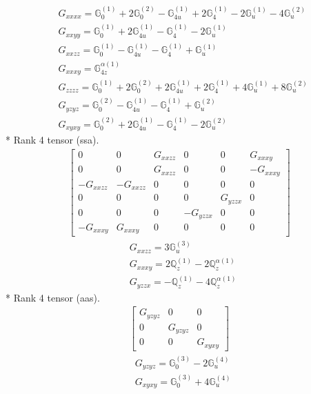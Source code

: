 \documentclass[fleqn,8pt,landscape]{jsarticle}
\begin{document}
\begin{align*}
& G_{xxxx} = \mathbb{G}_{0}^{(1)} + 2 \mathbb{G}_{0}^{(2)} - \mathbb{G}_{4u}^{(1)} + 2 \mathbb{G}_{4}^{(1)} - 2 \mathbb{G}_{u}^{(1)} - 4 \mathbb{G}_{u}^{(2)} \\
& G_{xxyy} = \mathbb{G}_{0}^{(1)} + 2 \mathbb{G}_{4u}^{(1)} - \mathbb{G}_{4}^{(1)} - 2 \mathbb{G}_{u}^{(1)} \\
& G_{xxzz} = \mathbb{G}_{0}^{(1)} - \mathbb{G}_{4u}^{(1)} - \mathbb{G}_{4}^{(1)} + \mathbb{G}_{u}^{(1)} \\
& G_{xxxy} = \mathbb{G}_{4z}^{\alpha(1)} \\
& G_{zzzz} = \mathbb{G}_{0}^{(1)} + 2 \mathbb{G}_{0}^{(2)} + 2 \mathbb{G}_{4u}^{(1)} + 2 \mathbb{G}_{4}^{(1)} + 4 \mathbb{G}_{u}^{(1)} + 8 \mathbb{G}_{u}^{(2)} \\
& G_{yzyz} = \mathbb{G}_{0}^{(2)} - \mathbb{G}_{4u}^{(1)} - \mathbb{G}_{4}^{(1)} + \mathbb{G}_{u}^{(2)} \\
& G_{xyxy} = \mathbb{G}_{0}^{(2)} + 2 \mathbb{G}_{4u}^{(1)} - \mathbb{G}_{4}^{(1)} - 2 \mathbb{G}_{u}^{(2)}
\end{align*}
* Rank 4 tensor (ssa).
\begin{align*}
\begin{bmatrix} 0 & 0 & G_{xxzz} & 0 & 0 & G_{xxxy} \\ 0 & 0 & G_{xxzz} & 0 & 0 & - G_{xxxy} \\ - G_{xxzz} & - G_{xxzz} & 0 & 0 & 0 & 0 \\ 0 & 0 & 0 & 0 & G_{yzzx} & 0 \\ 0 & 0 & 0 & - G_{yzzx} & 0 & 0 \\ - G_{xxxy} & G_{xxxy} & 0 & 0 & 0 & 0 \end{bmatrix}
\end{align*}
\begin{align*}
& G_{xxzz} = 3 \mathbb{G}_{u}^{(3)} \\
& G_{xxxy} = 2 \mathbb{Q}_{z}^{(1)} - 2 \mathbb{Q}_{z}^{\alpha(1)} \\
& G_{yzzx} = - \mathbb{Q}_{z}^{(1)} - 4 \mathbb{Q}_{z}^{\alpha(1)}
\end{align*}
* Rank 4 tensor (aas).
\begin{align*}
\begin{bmatrix} G_{yzyz} & 0 & 0 \\ 0 & G_{yzyz} & 0 \\ 0 & 0 & G_{xyxy} \end{bmatrix}
\end{align*}
\begin{align*}
& G_{yzyz} = \mathbb{G}_{0}^{(3)} - 2 \mathbb{G}_{u}^{(4)} \\
& G_{xyxy} = \mathbb{G}_{0}^{(3)} + 4 \mathbb{G}_{u}^{(4)}
\end{align*}
\end{document}
